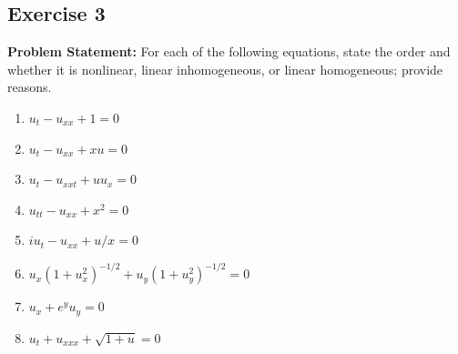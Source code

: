 \documentclass[11pt,a4paper]{article}
\begin{document}
\subsection*{Exercise 3}
\textbf{Problem Statement:} For each of the following equations, state the order and whether it is nonlinear, linear inhomogeneous, or linear homogeneous; provide reasons.
\begin{enumerate}[label=(\alph*)]
    \item $u_t - u_{xx} + 1 = 0$
    \item $u_t - u_{xx} + x u = 0$
    \item $u_t - u_{xxt} + u u_x = 0$
    \item $u_{tt} - u_{xx} + x^2 = 0$
    \item $i u_t - u_{xx} + u/x = 0$
    \item $u_x(1 + u_x^2)^{-1/2} + u_y(1 + u_y^2)^{-1/2} = 0$
    \item $u_x + e^y u_y = 0$
    \item $u_t + u_{xxx} + \sqrt{1 + u} = 0$
\end{enumerate}
\end{document}
